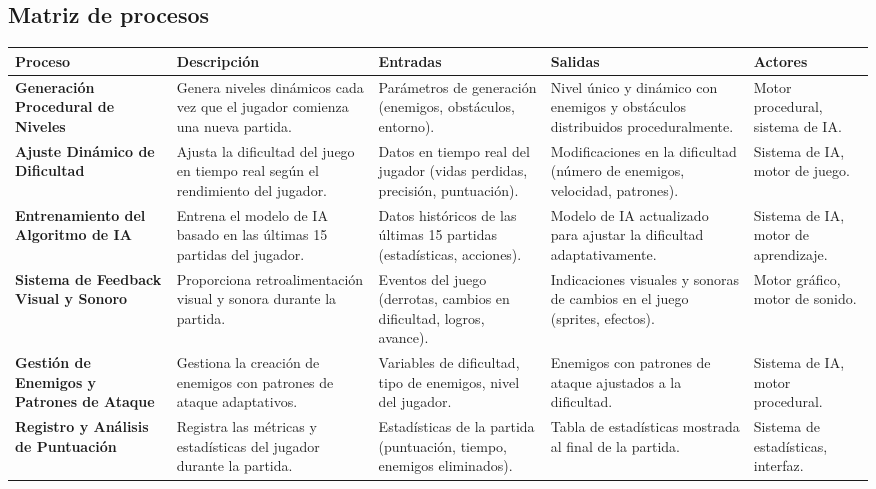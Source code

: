 \subsection{Matriz de procesos}

\begin{table}[H]
    \centering
    \begin{adjustbox}{width=\textwidth}
        \begin{tabular}{|p{4cm}|p{5cm}|p{4cm}|p{4cm}|p{4cm}|}
        \hline
        \textbf{Proceso} & \textbf{Descripción} & \textbf{Entradas} & \textbf{Salidas} & \textbf{Actores} \\
        \hline
        \textbf{Generación Procedural de Niveles} & Genera niveles dinámicos cada vez que el jugador comienza una nueva partida. & Parámetros de generación (enemigos, obstáculos, entorno). & Nivel único y dinámico con enemigos y obstáculos distribuidos proceduralmente. & Motor procedural, sistema de IA. \\
        \hline
        \textbf{Ajuste Dinámico de Dificultad} & Ajusta la dificultad del juego en tiempo real según el rendimiento del jugador. & Datos en tiempo real del jugador (vidas perdidas, precisión, puntuación). & Modificaciones en la dificultad (número de enemigos, velocidad, patrones). & Sistema de IA, motor de juego. \\
        \hline
        \textbf{Entrenamiento del Algoritmo de IA} & Entrena el modelo de IA basado en las últimas 15 partidas del jugador. & Datos históricos de las últimas 15 partidas (estadísticas, acciones). & Modelo de IA actualizado para ajustar la dificultad adaptativamente. & Sistema de IA, motor de aprendizaje. \\
        \hline
        \textbf{Sistema de Feedback Visual y Sonoro} & Proporciona retroalimentación visual y sonora durante la partida. & Eventos del juego (derrotas, cambios en dificultad, logros, avance). & Indicaciones visuales y sonoras de cambios en el juego (sprites, efectos). & Motor gráfico, motor de sonido. \\
        \hline
        \textbf{Gestión de Enemigos y Patrones de Ataque} & Gestiona la creación de enemigos con patrones de ataque adaptativos. & Variables de dificultad, tipo de enemigos, nivel del jugador. & Enemigos con patrones de ataque ajustados a la dificultad. & Sistema de IA, motor procedural. \\
        \hline
        \textbf{Registro y Análisis de Puntuación} & Registra las métricas y estadísticas del jugador durante la partida. & Estadísticas de la partida (puntuación, tiempo, enemigos eliminados). & Tabla de estadísticas mostrada al final de la partida. & Sistema de estadísticas, interfaz. \\

\end{tabular}
\end{adjustbox}
\end{table}
